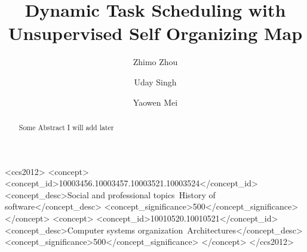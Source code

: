 
\title{Dynamic Task Scheduling with Unsupervised Self Organizing Map}


\author{Zhimo Zhou}
\author{Uday Singh}
\author{Yaowen Mei}

\begin{abstract}
Some Abstract I will add later
\end{abstract}

\begin{CCSXML}
<ccs2012>
   <concept>
       <concept_id>10003456.10003457.10003521.10003524</concept_id>
       <concept_desc>Social and professional topics~History of software</concept_desc>
       <concept_significance>500</concept_significance>
       </concept>
   <concept>
       <concept_id>10010520.10010521</concept_id>
       <concept_desc>Computer systems organization~Architectures</concept_desc>
       <concept_significance>500</concept_significance>
       </concept>
 </ccs2012>
\end{CCSXML}


